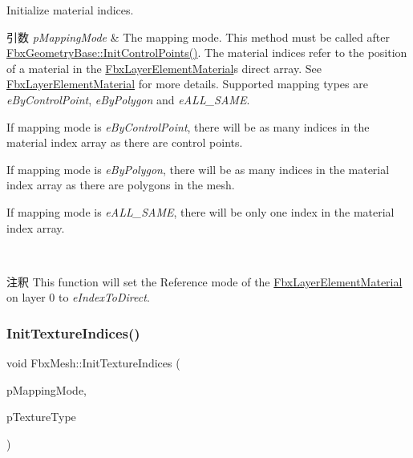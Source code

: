 Initialize material indices. 
\begin{DoxyParams}{引数}
{\em p\+Mapping\+Mode} & The mapping mode. This method must be called after \hyperlink{class_fbx_geometry_base_a471b736f2595c006a338c07a61907127}{Fbx\+Geometry\+Base\+::\+Init\+Control\+Points()}. The material indices refer to the position of a material in the \hyperlink{class_fbx_layer_element_material}{Fbx\+Layer\+Element\+Material}\textquotesingle{}s direct array. See \hyperlink{class_fbx_layer_element_material}{Fbx\+Layer\+Element\+Material} for more details. Supported mapping types are {\itshape e\+By\+Control\+Point}, {\itshape e\+By\+Polygon} and {\itshape e\+A\+L\+L\+\_\+\+S\+A\+ME}.
\begin{DoxyItemize}
\item If mapping mode is {\itshape e\+By\+Control\+Point}, there will be as many indices in the material index array as there are control points.
\item If mapping mode is {\itshape e\+By\+Polygon}, there will be as many indices in the material index array as there are polygons in the mesh.
\item If mapping mode is {\itshape e\+A\+L\+L\+\_\+\+S\+A\+ME}, there will be only one index in the material index array. 
\end{DoxyItemize}\\
\hline
\end{DoxyParams}
\begin{DoxyRemark}{注釈}
This function will set the Reference mode of the \hyperlink{class_fbx_layer_element_material}{Fbx\+Layer\+Element\+Material} on layer 0 to {\itshape e\+Index\+To\+Direct}. 
\end{DoxyRemark}
\mbox{\label{class_fbx_mesh_a7400d37014c8a84a5c356f1deef1761d}} 
\subsubsection{\texorpdfstring{Init\+Texture\+Indices()}{InitTextureIndices()}\hspace{0.1cm}{\footnotesize\ttfamily [1/2]}}
{\footnotesize\ttfamily void Fbx\+Mesh\+::\+Init\+Texture\+Indices (\begin{DoxyParamCaption}\item[{\hyperlink{class_fbx_layer_element_a5a40e95db30ae9f94611dc3f1568af26}{Fbx\+Layer\+Element\+::\+E\+Mapping\+Mode}}]{p\+Mapping\+Mode,  }\item[{\hyperlink{class_fbx_layer_element_a8c95c5cd880b56c776acd379bd86f42c}{Fbx\+Layer\+Element\+::\+E\+Type}}]{p\+Texture\+Type }\end{DoxyParamCaption})}

